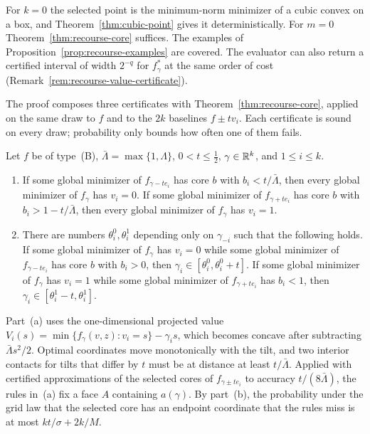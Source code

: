 For $k=0$ the selected point is the minimum-norm minimizer of a cubic
convex on a box, and Theorem~\ref{thm:cubic-point} gives it
deterministically. For $m=0$ Theorem~\ref{thm:recourse-core} suffices.
The examples of Proposition~\ref{prop:recourse-examples} are covered.
The evaluator can also return a certified interval of width $2^{-q}$
for $f_\gamma^*$ at the same order of cost
(Remark~\ref{rem:recourse-value-certificate}).

The proof composes three certificates with
Theorem~\ref{thm:recourse-core}, applied on the same draw to $f$ and to
the $2k$ baselines $f\pm tv_i$. Each certificate is sound on every draw;
probability only bounds how often one of them fails.

\begin{lemma}
\label{lem:recourse-face}
Let $f$ be of type~(B), $\bar\Lambda=\max\{1,\Lambda\}$,
$0<t\le\frac12$, $\gamma\in\mathbb R^k$, and $1\le i\le k$.
\begin{enumerate}[label=(\alph*)]
\item If some global minimizer of $f_{\gamma-te_i}$ has core $b$ with
$b_i<t/\bar\Lambda$, then every global minimizer of $f_\gamma$ has
$v_i=0$. If some global minimizer of $f_{\gamma+te_i}$ has core $b$ with
$b_i>1-t/\bar\Lambda$, then every global minimizer of $f_\gamma$ has
$v_i=1$.
\item There are numbers $\theta_i^0,\theta_i^1$ depending only on
$\gamma_{-i}$ such that the following holds. If some global minimizer
of $f_\gamma$ has $v_i=0$ while some global minimizer of
$f_{\gamma-te_i}$ has core $b$ with $b_i>0$, then
$\gamma_i\in[\theta_i^0,\theta_i^0+t]$. If some global minimizer of
$f_\gamma$ has $v_i=1$ while some global minimizer of $f_{\gamma+te_i}$
has $b_i<1$, then $\gamma_i\in[\theta_i^1-t,\theta_i^1]$.
\end{enumerate}
\end{lemma}

Part~(a) uses the one-dimensional projected value
$V_i(s)=\min\{f_\gamma(v,z):v_i=s\}-\gamma_is$, which becomes concave
after subtracting $\bar\Lambda s^2/2$. Optimal coordinates move
monotonically with the tilt, and two interior contacts for tilts that
differ by $t$ must be at distance at least $t/\bar\Lambda$. Applied with
certified approximations of the selected cores of $f_{\gamma\pm te_i}$
to accuracy $t/(8\bar\Lambda)$, the rules in~(a) fix a face $A$
containing $a(\gamma)$. By part~(b), the probability under the grid law
that the selected core has an endpoint coordinate that the rules miss
is at most $kt/\sigma+2k/M$.

